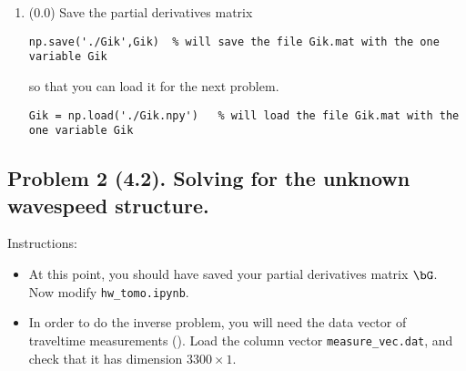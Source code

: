 \documentclass[11pt,titlepage,fleqn]{article}
\newcommand{\tfiletomo}{{\tt hw\_tomo.ipynb}}
\begin{document}
\begin{enumerate}

\item (0.0) Save the partial derivatives matrix
%
\begin{verbatim}
np.save('./Gik',Gik)  % will save the file Gik.mat with the one variable Gik
\end{verbatim}
%
so that you can load it for the next problem.
%
\begin{verbatim}
Gik = np.load('./Gik.npy')   % will load the file Gik.mat with the one variable Gik
\end{verbatim}

\end{enumerate}


\pagebreak
\subsection*{Problem 2 (4.2). Solving for the unknown wavespeed structure.}

Instructions:
%
\begin{itemize}
\item At this point, you should have saved your partial derivatives matrix $\bG$. \\ Now modify \tfiletomo.

\item In order to do the inverse problem, you will need the data vector of traveltime measurements (). Load the column vector \verb+measure_vec.dat+, and check that it has dimension \mbox{$3300 \times 1$}.

\end{itemize}
\end{document}
